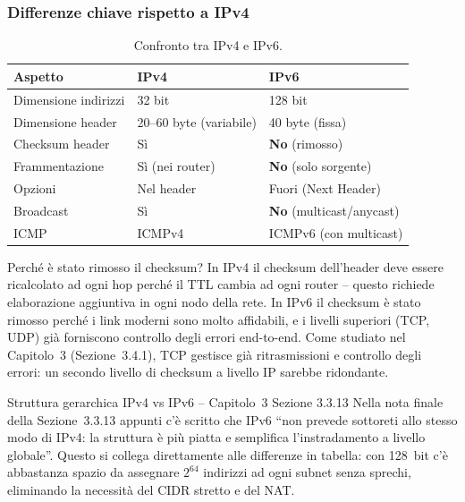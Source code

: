 \documentclass[a4paper,12pt]{report}
\begin{document}
\subsubsection{Differenze chiave rispetto a IPv4}

\begin{table}[H]
\centering
\caption{Confronto tra IPv4 e IPv6.}
\begin{tabular}{lll}
\toprule
\textbf{Aspetto} & \textbf{IPv4} & \textbf{IPv6} \\
\midrule
Dimensione indirizzi & 32 bit & 128 bit \\
Dimensione header & 20--60 byte (variabile) & 40 byte (fissa) \\
Checksum header & Sì & \textbf{No} (rimosso) \\
Frammentazione & Sì (nei router) & \textbf{No} (solo sorgente) \\
Opzioni & Nel header & Fuori (Next Header) \\
Broadcast & Sì & \textbf{No} (multicast/anycast) \\
ICMP & ICMPv4 & ICMPv6 (con multicast) \\
\bottomrule
\end{tabular}
\end{table}

\begin{notebox}{Perché è stato rimosso il checksum?}
In IPv4 il checksum dell'header deve essere ricalcolato ad
ogni hop perché il TTL cambia ad ogni router -- questo
richiede elaborazione aggiuntiva in ogni nodo della rete.
In IPv6 il checksum è stato rimosso perché i link moderni
sono molto affidabili, e i livelli superiori (TCP, UDP)
già forniscono controllo degli errori end-to-end. Come
 studiato nel Capitolo~3 (Sezione~3.4.1), TCP gestisce
già ritrasmissioni e controllo degli errori: un secondo
livello di checksum a livello IP sarebbe ridondante.
\end{notebox}

\begin{notebox}{Struttura gerarchica IPv4 vs IPv6 --
Capitolo~3 Sezione 3.3.13}
Nella nota finale della Sezione~3.3.13 appunti
c'è scritto che IPv6 ``non prevede sottoreti allo stesso modo
di IPv4: la struttura è più piatta e semplifica
l'instradamento a livello globale''. Questo si collega
direttamente alle differenze in tabella: con 128~bit c'è
abbastanza spazio da assegnare $2^{64}$ indirizzi ad ogni
subnet senza sprechi, eliminando la necessità del CIDR
stretto e del NAT.
\end{notebox}
\end{document}

